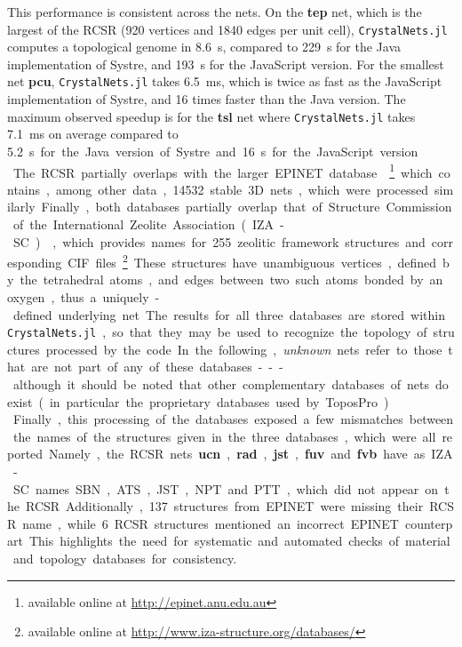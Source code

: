 \documentclass[main.tex]{subfiles}
\begin{document}
This performance is consistent across the nets. On the \textbf{tep} net, which is the largest of the RCSR (920 vertices and \num{1840} edges per unit cell), \texttt{CrystalNets.jl} computes a topological genome in \qty{8.6}{s}, compared to \qty{229}{s} for the Java implementation of Systre, and \qty{193}{s} for the JavaScript version. For the smallest net \textbf{pcu}, \texttt{CrystalNets.jl} takes \qty{6.5}{ms}, which is twice as fast as the JavaScript implementation of Systre, and 16 times faster than the Java version. The maximum observed speedup is for the \textbf{tsl} net where \texttt{CrystalNets.jl} takes \qty{7.1}{ms} on average compared to \SI{5.2}s for the Java version of Systre and \SI{16}s for the JavaScript version.\\

The RCSR partially overlaps with the larger EPINET database \autocite{Epinet0} \footnote{available online at \url{http://epinet.anu.edu.au}} which contains, among other data, \num{14532} stable 3D nets, which were processed similarly. Finally, both databases partially overlap that of Structure Commission of the International Zeolite Association (IZA-SC) \autocite{IZA}, which provides names for \num{255} zeolitic framework structures and corresponding CIF files.\footnote{available online at \url{http://www.iza-structure.org/databases/}} These structures have unambiguous vertices, defined by the tetrahedral atoms, and edges between two such atoms bonded by an oxygen, thus a uniquely-defined underlying net.

The results for all three databases are stored within \texttt{CrystalNets.jl}, so that they may be used to recognize the topology of structures processed by the code. In the following, \emph{unknown} nets refer to those that are not part of any of these databases --- although it should be noted that other complementary databases of nets do exist (in particular the proprietary databases used by ToposPro).\\

Finally, this processing of the databases exposed a few mismatches between the names of the structures given in the three databases, which were all reported. Namely, the RCSR nets \textbf{ucn}, \textbf{rad}, \textbf{jst}, \textbf{fuv} and \textbf{fvb} have as IZA-SC names SBN, ATS, JST, NPT and PTT, which did not appear on the RCSR. Additionally, 137 structures from EPINET were missing their RCSR name, while 6 RCSR structures mentioned an incorrect EPINET counterpart.
This highlights the need for systematic and automated checks of material and topology databases for consistency.
\end{document}
